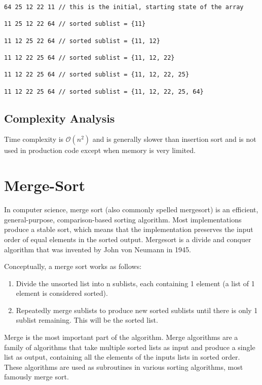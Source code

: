 \begin{verbatim}
64 25 12 22 11 // this is the initial, starting state of the array

11 25 12 22 64 // sorted sublist = {11}

11 12 25 22 64 // sorted sublist = {11, 12}

11 12 22 25 64 // sorted sublist = {11, 12, 22}

11 12 22 25 64 // sorted sublist = {11, 12, 22, 25}

11 12 22 25 64 // sorted sublist = {11, 12, 22, 25, 64}
\end{verbatim}
\subsection{Complexity Analysis}
Time complexity is  $\mathcal{O}(n^2)$ and is generally slower than insertion sort and is not used in production code except when memory is very limited.





\section{Merge-Sort}
In computer science, merge sort (also commonly spelled mergesort) is an efficient, general-purpose, comparison-based sorting algorithm. Most implementations produce a stable sort, which means that the implementation preserves the input order of equal elements in the sorted output. Mergesort is a divide and conquer algorithm that was invented by John von Neumann in 1945.

Conceptually, a merge sort works as follows:
\begin{enumerate}
\item Divide the unsorted list into n sublists, each containing 1 element (a list of 1 element is considered sorted).
\item Repeatedly merge sublists to produce new sorted sublists until there is only 1 sublist remaining. This will be the sorted list.
\end{enumerate} 

Merge is the most important part of the algorithm. Merge algorithms are a family of algorithms that take multiple sorted lists as input and produce a single list as output, containing all the elements of the inputs lists in sorted order. These algorithms are used as subroutines in various sorting algorithms, most famously merge sort.

